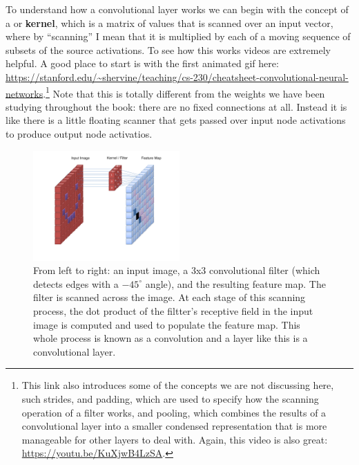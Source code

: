 To understand how a convolutional  layer works we can begin with the concept of a  or \textbf{kernel}, which is a matrix of values that is scanned over an input vector, where by ``scanning'' I mean that it is multiplied by each of a moving sequence of subsets of the source activations. To see how this works videos are extremely helpful. A good place  to start is with the first animated gif here: \url{https://stanford.edu/~shervine/teaching/cs-230/cheatsheet-convolutional-neural-networks}.\footnote{This link also introduces some of the concepts we are not discussing here, such strides, and padding, which are used to specify how the scanning operation of a filter works, and pooling, which combines the results of a convolutional layer into a smaller  condensed representation that is more manageable for other layers to deal with. Again, this video is also great: \url{https://youtu.be/KuXjwB4LzSA}.} Note that this is totally different from the weights we have been studying throughout the book: there are no fixed connections at all. Instead it is like there is a little floating scanner that gets passed over input node activations to produce output node activatios.

\begin{figure}[h]
\centering
\includegraphics[width=0.5\textwidth]{images/CNN_Filter.png}
\caption[User Cecbur, \url{https://commons.wikimedia.org/wiki/File:Convolutional_Neural_Network_NeuralNetworkFilter.gif}, with labels added by Jeff Yoshimi.]{From left to right: an input image, a 3x3 convolutional filter (which detects edges with a $-45^\circ$ angle), and the resulting feature map. The filter is scanned across the image. At each stage of this scanning process, the dot product of the filtter's receptive field in the input image is computed and used to populate the feature map. This whole process is known as a convolution and a layer like this is a convolutional layer.}
\label{cnn_filter}
\end{figure}

